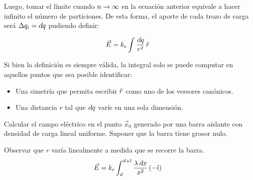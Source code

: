 Luego, tomar el límite cuando $n\to\infty$ en la ecuación anterior equivale a hacer infinito el número de particiones.
De esta forma, el aporte de cada trozo de carga será $\Delta q_i = \textsl{d} q$ pudiendo definir:

\begin{mdframed}[style=DefinitionFrame]
    \begin{defn}
    \end{defn}
    \begin{equation*}
        \Vec{E} = k_e \int \frac{\textsl{d} q}{r^2} \, \hat{r}
    \end{equation*}
\end{mdframed}

Si bien la definición es siempre válida, la integral solo se puede computar en aquellos puntos que sea posible identificar:
\begin{itemize}
    \item Una simetría que permita escribir $\hat{r}$ como uno de los versores canónicos.
    \item Una distancia $r$ tal que $\textsl{d} q$ varíe en una sola dimensión.
\end{itemize}

\begin{mdframed}[style=ExampleFrame]
    \begin{example}
    \end{example}
    \begin{formatI}
        Calcular el campo eléctrico en el punto $\vec{x}_0$ generado por una barra aislante con densidad de carga lineal uniforme.
        Suponer que la barra tiene grosor nulo.
    \end{formatI}

    \begin{center}
        \def\svgwidth{\linewidth}
        
    \end{center}

    Observar que $r$ varía linealmente a medida que se recorre la barra.
    \begin{equation*}
        \vec{E} = k_e \int_{d}^{d+l} \frac{\lambda \, \textsl{d} x}{x^2} \left(- \hat{\imath}\right)
    \end{equation*}
\end{mdframed}

